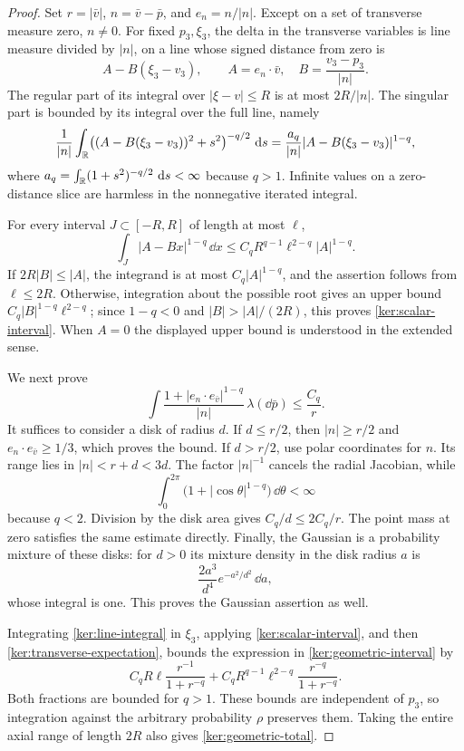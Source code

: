 \begin{proof}
Set $r=|\bar v|$, $n=\bar v-\bar p$, and $e_n=n/|n|$. Except on a
set of transverse measure zero, $n\ne0$. For fixed $p_3,\xi_3$, the
delta in the transverse variables is line measure divided by $|n|$,
on a line whose signed distance from zero is
\[
 A-B(\xi_3-v_3),\qquad
 A=e_n\cdot\bar v,\quad B=\frac{v_3-p_3}{|n|}.
\]
The regular part of its integral over $|\xi-v|\leq R$ is at most
$2R/|n|$. The singular part is bounded by its integral over the full
line, namely
\begin{equation}\label{ker:line-integral}
 \frac{1}{|n|}\int_{\mathbb R}
      \bigl((A-B(\xi_3-v_3))^2+s^2\bigr)^{-q/2}\,\,\mathrm d s
 =\frac{a_q}{|n|}|A-B(\xi_3-v_3)|^{1-q},
\end{equation}
where $a_q=\int_{\mathbb R}(1+s^2)^{-q/2}\,\,\mathrm d s<\infty$ because $q>1$.
Infinite values on a zero-distance slice are harmless in the
nonnegative iterated integral.

For every interval $J\subset[-R,R]$ of length at most $\ell$,
\begin{equation}\label{ker:scalar-interval}
 \int_J |A-Bx|^{1-q}\,\dd x
 \leq C_q R^{q-1}\ell^{2-q}|A|^{1-q}.
\end{equation}
If $2R|B|\leq|A|$, the integrand is at most
$C_q|A|^{1-q}$, and the assertion follows from $\ell\leq2R$.
Otherwise, integration about the possible root gives an upper bound
$C_q|B|^{1-q}\ell^{2-q}$; since $1-q<0$ and
$|B|>|A|/(2R)$, this proves \eqref{ker:scalar-interval}. When $A=0$
the displayed upper bound is understood in the extended sense.

We next prove
\begin{equation}\label{ker:transverse-expectation}
 \int\frac{1+|e_n\cdot e_{\bar v}|^{1-q}}{|n|}\,
          \lambda(\dd\bar p)\leq\frac{C_q}{r}.
\end{equation}
It suffices to consider a disk of radius $d$. If $d\leq r/2$, then
$|n|\geq r/2$ and $e_n\cdot e_{\bar v}\geq1/3$, which proves the
bound. If $d>r/2$, use polar coordinates for $n$. Its range lies in
$|n|<r+d<3d$. The factor $|n|^{-1}$ cancels the radial Jacobian, while
\[
 \int_0^{2\pi}\bigl(1+|\cos\theta|^{1-q}\bigr)\,\dd\theta<\infty
\]
because $q<2$. Division by the disk area gives $C_q/d\leq2C_q/r$.
The point mass at zero satisfies the same estimate directly.
Finally, the Gaussian is a probability mixture of these disks: for
$d>0$ its mixture density in the disk radius $a$ is
\[
 \frac{2a^3}{d^4}e^{-a^2/d^2}\,\dd a,
\]
whose integral is one. This proves the Gaussian assertion as well.

Integrating \eqref{ker:line-integral} in $\xi_3$, applying
\eqref{ker:scalar-interval}, and then
\eqref{ker:transverse-expectation}, bounds the expression in
\eqref{ker:geometric-interval} by
\[
 C_q R\ell\frac{r^{-1}}{1+r^{-q}}
 +C_qR^{q-1}\ell^{2-q}\frac{r^{-q}}{1+r^{-q}}.
\]
Both fractions are bounded for $q>1$. These bounds are independent of
$p_3$, so integration against the arbitrary probability $\rho$
preserves them. Taking the entire axial range of length $2R$ also
gives \eqref{ker:geometric-total}.
\end{proof}

